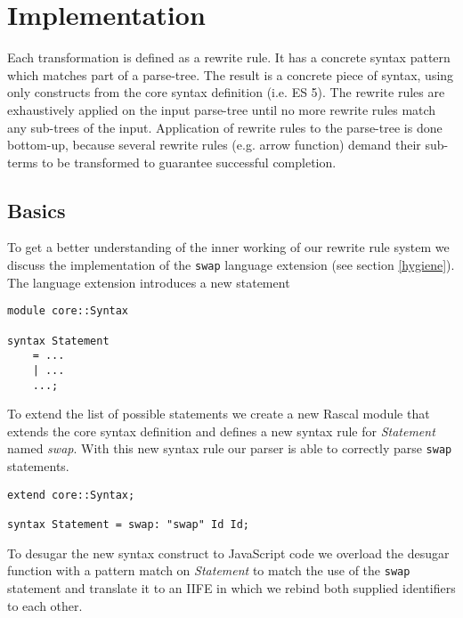 \chapter{Implementation} %

\label{Chapter5}


Each transformation is defined as a rewrite rule. It has a concrete syntax pattern which matches part of a parse-tree. The result is a concrete piece of syntax, using only constructs from the core syntax definition (i.e. ES 5).
The rewrite rules are exhaustively applied on the input parse-tree until no more rewrite rules match any sub-trees of the input. Application of rewrite rules to the parse-tree is done bottom-up, because several rewrite rules (e.g. arrow function) demand their sub-terms to be transformed to guarantee successful completion.

\section{Basics}
To get a better understanding of the inner working of our rewrite rule system we discuss the implementation of the \lstinline$swap$ language extension (see section \ref{hygiene}). The language extension introduces a new statement 

\begin{lstlisting}[caption=Core syntax,language=rascal]
module core::Syntax

syntax Statement 
	= ...
	| ...
	...;
\end{lstlisting}

To extend the list of possible statements we create a new Rascal module that extends the core syntax definition and defines a new syntax rule for \textit{Statement} named \textit{swap}. With this new syntax rule our parser is able to correctly parse \lstinline$swap$ statements.

\begin{lstlisting}[caption=Swap statement syntax,language=rascal]
extend core::Syntax;

syntax Statement = swap: "swap" Id Id;
\end{lstlisting}

To desugar the new syntax construct to JavaScript code we overload the desugar function with a pattern match on 
\textit{Statement} to match the use of the \lstinline$swap$ statement and translate it to an IIFE in which we rebind both supplied identifiers to each other.

